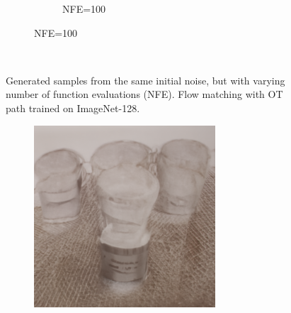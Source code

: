 \documentclass{article}
\begin{document}
\begin{figure}
\begin{subfigure}[b]{0.5\linewidth}
\begin{subfigure}[b]{0.242\linewidth}
        \caption*{NFE=100}
        \end{subfigure}
    \end{subfigure}\\
    \caption{Generated samples from the same initial noise, but with varying number of function evaluations (NFE). 
    Flow matching with OT path trained on ImageNet-128.}
\end{figure}

\begin{figure}
    \centering
    
    \begin{subfigure}[b]{0.19\linewidth}
    \includegraphics[width=\linewidth]{figures/imagenet256/solver_samples/imagenet256_fm_ot_11_05.png}
    \end{subfigure}
    \begin{subfigure}[b]{0.19\linewidth}

\end{subfigure}
\end{figure}
\end{document}
